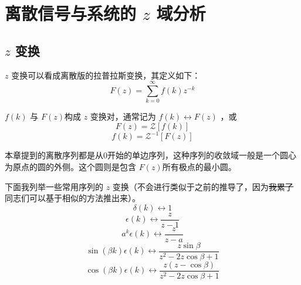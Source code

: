 \documentclass[UTF8,a4paper,11pt]{article}
\begin{document}
\section{离散信号与系统的 $z$ 域分析}
\subsection{$z$ 变换}
$z$ 变换可以看成离散版的拉普拉斯变换，其定义如下：
\begin{equation}
F(z)=\sum_{k=0}^{\infty} f(k)z^{-k}
\end{equation}

$f(k)$ 与 $F(z)$构成 $z$ 变换对，通常记为 $f(k)\leftrightarrow F(z)$ ，或
\begin{equation}
F(z)=\mathscr{Z}[f(k)]
\end{equation}
\begin{equation}
f(k)=\mathscr{Z}^{-1}[F(z)]
\end{equation}

本章提到的离散序列都是从0开始的单边序列，这种序列的收敛域一般是一个圆心为原点的圆的外侧。这个圆则是包含 $F(z)$所有极点的最小圆。

下面我列举一些常用序列的 $z$ 变换（不会进行类似于之前的推导了，因为\sout{我累了}同志们可以基于相似的方法推出来）。
\begin{equation}
\delta(k)\leftrightarrow 1
\end{equation}
\begin{equation}
\epsilon(k)\leftrightarrow\frac{z}{z-1}
\end{equation}
\begin{equation}
a^k\epsilon(k)\leftrightarrow\frac{z}{z-a}
\end{equation}
\begin{equation}
\sin(\beta k)\epsilon(k)\leftrightarrow\frac{z\sin\beta}{z^2-2z\cos\beta+1}
\end{equation}
\begin{equation}
\cos(\beta k)\epsilon(k)\leftrightarrow\frac{z(z-\cos\beta)}{z^2-2z\cos\beta+1}
\end{equation}
\end{document}
